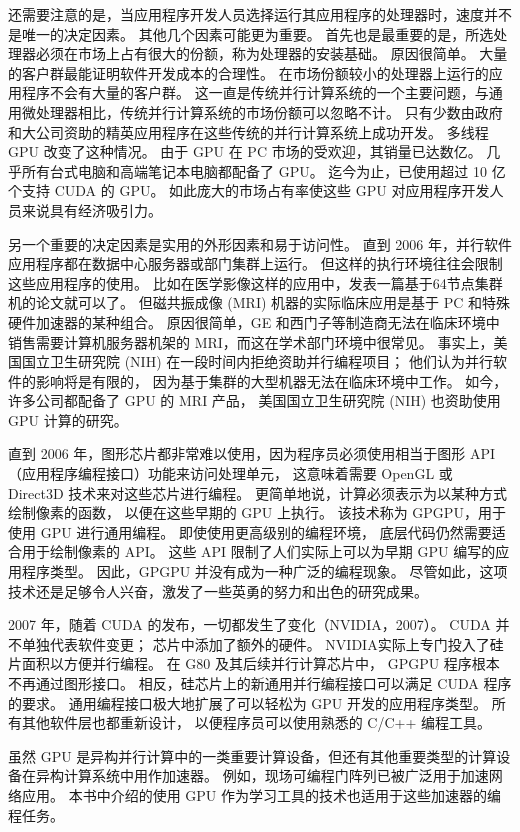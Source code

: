 还需要注意的是，当应用程序开发人员选择运行其应用程序的处理器时，速度并不是唯一的决定因素。 其他几个因素可能更为重要。 
首先也是最重要的是，所选处理器必须在市场上占有很大的份额，称为处理器的安装基础。 原因很简单。 
大量的客户群最能证明软件开发成本的合理性。 在市场份额较小的处理器上运行的应用程序不会有大量的客户群。 
这一直是传统并行计算系统的一个主要问题，与通用微处理器相比，传统并行计算系统的市场份额可以忽略不计。 
只有少数由政府和大公司资助的精英应用程序在这些传统的并行计算系统上成功开发。 多线程 GPU 改变了这种情况。 
由于 GPU 在 PC 市场的受欢迎，其销量已达数亿。 几乎所有台式电脑和高端笔记本电脑都配备了 GPU。 
迄今为止，已使用超过 10 亿个支持 CUDA 的 GPU。 如此庞大的市场占有率使这些 GPU 对应用程序开发人员来说具有经济吸引力。

另一个重要的决定因素是实用的外形因素和易于访问性。 直到 2006 年，并行软件应用程序都在数据中心服务器或部门集群上运行。 
但这样的执行环境往往会限制这些应用程序的使用。 比如在医学影像这样的应用中，发表一篇基于64节点集群机的论文就可以了。 
但磁共振成像 (MRI) 机器的实际临床应用是基于 PC 和特殊硬件加速器的某种组合。 
原因很简单，GE 和西门子等制造商无法在临床环境中销售需要计算机服务器机架的 MRI，而这在学术部门环境中很常见。 
事实上，美国国立卫生研究院 (NIH) 在一段时间内拒绝资助并行编程项目； 他们认为并行软件的影响将是有限的，
因为基于集群的大型机器无法在临床环境中工作。 如今，许多公司都配备了 GPU 的 MRI 产品，
美国国立卫生研究院 (NIH) 也资助使用 GPU 计算的研究。

直到 2006 年，图形芯片都非常难以使用，因为程序员必须使用相当于图形 API（应用程序编程接口）功能来访问处理单元，
这意味着需要 OpenGL 或 Direct3D 技术来对这些芯片进行编程。 更简单地说，计算必须表示为以某种方式绘制像素的函数，
以便在这些早期的 GPU 上执行。 该技术称为 GPGPU，用于使用 GPU 进行通用编程。 即使使用更高级别的编程环境，
底层代码仍然需要适合用于绘制像素的 API。 这些 API 限制了人们实际上可以为早期 GPU 编写的应用程序类型。 
因此，GPGPU 并没有成为一种广泛的编程现象。 尽管如此，这项技术还是足够令人兴奋，激发了一些英勇的努力和出色的研究成果。

2007 年，随着 CUDA 的发布，一切都发生了变化（NVIDIA，2007）。 CUDA 并不单独代表软件变更； 
芯片中添加了额外的硬件。 NVIDIA实际上专门投入了硅片面积以方便并行编程。 在 G80 及其后续并行计算芯片中，
GPGPU 程序根本不再通过图形接口。 相反，硅芯片上的新通用并行编程接口可以满足 CUDA 程序的要求。 
通用编程接口极大地扩展了可以轻松为 GPU 开发的应用程序类型。 所有其他软件层也都重新设计，
以便程序员可以使用熟悉的 C/C++ 编程工具。

虽然 GPU 是异构并行计算中的一类重要计算设备，但还有其他重要类型的计算设备在异构计算系统中用作加速器。 
例如，现场可编程门阵列已被广泛用于加速网络应用。 本书中介绍的使用 GPU 作为学习工具的技术也适用于这些加速器的编程任务。

